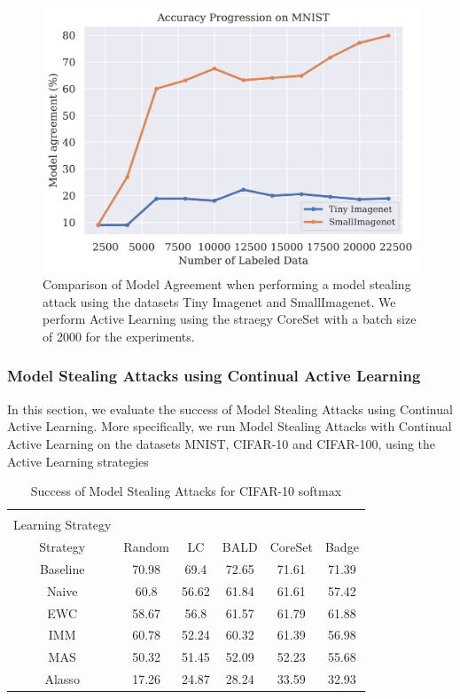 \begin{figure}[h]
    \centering
    \includegraphics[width=0.8\linewidth]{images/results_CALMS/effect_dataset.png}
    \caption[Effect of Thief Dataset choice on the success of Model Stealing Attacks]{Comparison of Model Agreement when performing a model stealing attack using the datasets Tiny Imagenet and SmallImagenet. We perform Active Learning using the 
    straegy CoreSet with a batch size of 2000 for the experiments.}
    \label{fig:Evaluation:Results:CAL:EffectDataset}
\end{figure}


\subsubsection{Model Stealing Attacks using Continual Active Learning}
\label{sec:Evaluation:Results:MS:CAL}

In this section, we evaluate the success of Model Stealing Attacks using Continual Active Learning. More specifically, we run Model Stealing Attacks with Continual Active Learning on the datasets MNIST, CIFAR-10 and CIFAR-100, using the Active Learning strategies

\begin{table}[h]
    \centering
    \begin{tabular}{c | c c c c c} 
        \hline
        \diagbox[width=11em]{Active \\ Learning Strategy}{Continual Learning \\ Strategy} & Random & LC & BALD & CoreSet & Badge \\ 
        \hline 
        Baseline & 70.98 & 69.4 & 72.65 & 71.61 & 71.39\\
        Naive & 60.8 & 56.62 & 61.84 & 61.61 & 57.42 \\
        EWC & 58.67 & 56.8 & 61.57 & 61.79 & 61.88 \\
        IMM & 60.78 & 52.24 & 60.32 & 61.39 & 56.98 \\
        MAS & 50.32 & 51.45 & 52.09 & 52.23 & 55.68 \\
        Alasso & 17.26 & 24.87 & 28.24 & 33.59 & 32.93 \\
        \hline
    \end{tabular}
    \caption{Success of Model Stealing Attacks for CIFAR-10 softmax}
    \label{fig:ModelStealingCIFAR10Softmax}
\end{table}

